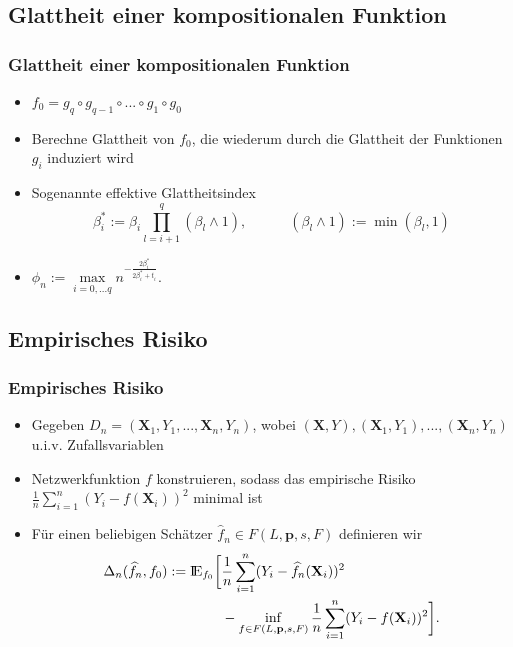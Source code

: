 \documentclass[hyperref={pdfpagelabels=false}]{beamer}
\begin{document}
\subsection{Glattheit einer kompositionalen Funktion}
\begin{frame}
\frametitle{Glattheit einer kompositionalen Funktion}
\begin{itemize}
\item $f_0 = g_q \circ g_{q-1} \circ ... \circ g_1 \circ g_0$
\item Berechne Glattheit von $f_0$, die wiederum durch die Glattheit der Funktionen $g_i$ induziert wird
\item Sogenannte effektive Glattheitsindex 
\begin{equation*}
\beta _i ^* := \beta _i \prod \limits_{l= i+1}^{q}(\beta _l \wedge 1), \quad \quad \quad (\beta _l \wedge 1) := \min(\beta _l, 1)
\end{equation*}
\item 
$
\phi _n := \max \limits_{i=0,...q} n^{- \frac{2 \beta _i ^*}{2 \beta _i ^* + t_i}}.
$
\end{itemize}
\end{frame}

\subsection{Empirisches Risiko}
\begin{frame}
\frametitle{Empirisches Risiko}
\begin{itemize}
\item Gegeben $D_n = {(\mathbf{X}_1, Y_ 1, ..., \mathbf{X}_n,Y_n)}$, wobei $(\mathbf{X},Y), (\mathbf{X}_1, Y_ 1), ..., (\mathbf{X}_n,Y_n)$ u.i.v. Zufallsvariablen
\item Netzwerkfunktion $f$ konstruieren, sodass das empirische Risiko $ \frac{1}{n} \sum\nolimits_{i=1}^n (Y_i - f(\mathbf{X}_i))^2$ minimal ist
\item Für einen beliebigen Schätzer $\widehat{f}_n \in F(L,\mathbf{p},s,F)$ definieren wir 
\begin{align*}
\Delta _n (\widehat{f}_n, f_0) := \mbox{I\negthinspace E} _{f_0}\bigg[& \frac{1}{n} \sum_{i = 1}^n (Y_i - \widehat{f}_n(\mathbf{X}_i))^2 \\ &- \inf _{f \in F(L, \mathbf{p}, s,F)} \frac{1}{n}\sum_{i = 1}^n (Y_i - f(\mathbf{X}_i))^2 \bigg].
\end{align*}
\end{itemize}
\end{frame}
\end{document}

